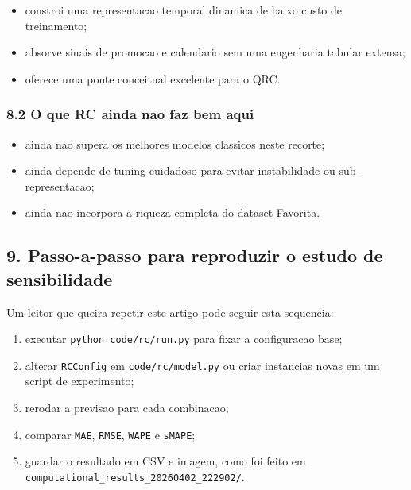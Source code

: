 \documentclass[12pt]{article}
\providecommand{\tightlist}{%
          \setlength{\itemsep}{0pt}\setlength{\parskip}{0pt}}
\begin{document}
\begin{itemize}
\tightlist
\item
  constroi uma representacao temporal dinamica de baixo custo de treinamento;
\item
  absorve sinais de promocao e calendario sem uma engenharia tabular extensa;
\item
  oferece uma ponte conceitual excelente para o QRC.
\end{itemize}

\subsubsection{8.2 O que RC ainda nao faz bem aqui}\label{82-o-que-rc-ainda-nao-faz-bem-aqui}

\begin{itemize}
\tightlist
\item
  ainda nao supera os melhores modelos classicos neste recorte;
\item
  ainda depende de tuning cuidadoso para evitar instabilidade ou sub-representacao;
\item
  ainda nao incorpora a riqueza completa do dataset Favorita.
\end{itemize}

\subsection{9. Passo-a-passo para reproduzir o estudo de sensibilidade}\label{9-passo-a-passo-para-reproduzir-o-estudo-de-sensibilidade}

Um leitor que queira repetir este artigo pode seguir esta sequencia:

\begin{enumerate}
\def\labelenumi{\arabic{enumi}.}
\tightlist
\item
  executar \texttt{python\ code/rc/run.py} para fixar a configuracao base;
\item
  alterar \texttt{RCConfig} em \texttt{code/rc/model.py} ou criar instancias novas em um script de experimento;
\item
  rerodar a previsao para cada combinacao;
\item
  comparar \texttt{MAE}, \texttt{RMSE}, \texttt{WAPE} e \texttt{sMAPE};
\item
  guardar o resultado em CSV e imagem, como foi feito em \texttt{computational\_results\_20260402\_222902/}.
\end{enumerate}
\end{document}
